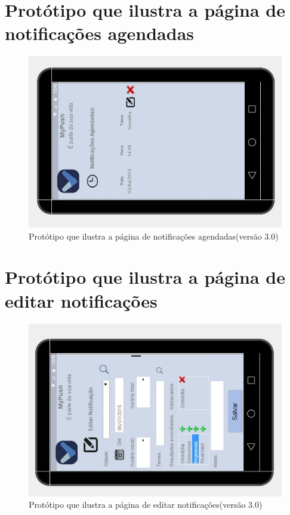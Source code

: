 \begin{apendicesenv}
      \section*{Protótipo que ilustra a página de notificações agendadas}

    \begin{figure}[!htbp]
      \centering
      \includegraphics[scale=0.5, angle=-90]{editaveis/figuras/prototipo_alta_fidelidade_v3/3_7}
      \caption{Protótipo que ilustra a página de notificações agendadas(versão 3.0)}
      \label{v3}
    \end{figure}
    
      \section*{Protótipo que ilustra a página de editar notificações}

    \begin{figure}[!htbp]
      \centering
      \includegraphics[scale=0.5, angle=-90]{editaveis/figuras/prototipo_alta_fidelidade_v3/3_8}
      \caption{Protótipo que ilustra a página de editar notificações(versão 3.0)}
      \label{v3}
    \end{figure}
    

\end{apendicesenv}
